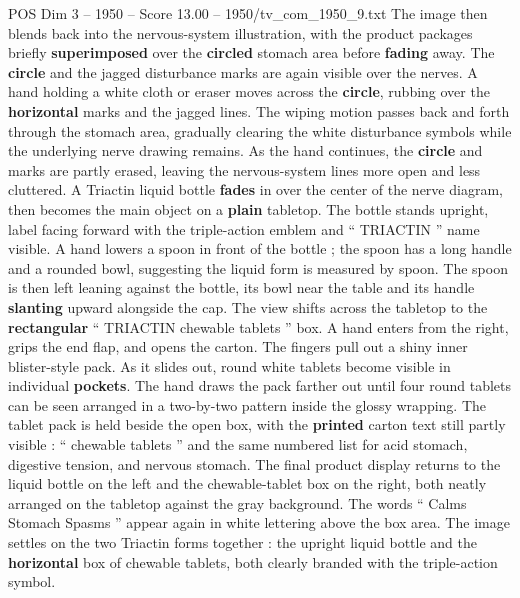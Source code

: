 \begin{textsample}{POS Dim 3 – 1950 – Score 13.00 – 1950/tv\_com\_1950\_9.txt}
The image then blends back into the nervous-system illustration, with the product packages briefly \textbf{superimposed} over the \textbf{circled} stomach area before \textbf{fading} away.
The \textbf{circle} and the jagged disturbance marks are again visible over the nerves.
A hand holding a white cloth or eraser moves across the \textbf{circle}, rubbing over the \textbf{horizontal} marks and the jagged lines.
The wiping motion passes back and forth through the stomach area, gradually clearing the white disturbance symbols while the underlying nerve drawing remains.
As the hand continues, the \textbf{circle} and marks are partly erased, leaving the nervous-system lines more open and less cluttered.
A Triactin liquid bottle \textbf{fades} in over the center of the nerve diagram, then becomes the main object on a \textbf{plain} tabletop.
The bottle stands upright, label facing forward with the triple-action emblem and “ TRIACTIN ” name visible.
A hand lowers a spoon in front of the bottle ; the spoon has a long handle and a rounded bowl, suggesting the liquid form is measured by spoon.
The spoon is then left leaning against the bottle, its bowl near the table and its handle \textbf{slanting} upward alongside the cap.
The view shifts across the tabletop to the \textbf{rectangular} “ TRIACTIN chewable tablets ” box.
A hand enters from the right, grips the end flap, and opens the carton.
The fingers pull out a shiny inner blister-style pack.
As it slides out, round white tablets become visible in individual \textbf{pockets}.
The hand draws the pack farther out until four round tablets can be seen arranged in a two-by-two pattern inside the glossy wrapping.
The tablet pack is held beside the open box, with the \textbf{printed} carton text still partly visible : “ chewable tablets ” and the same numbered list for acid stomach, digestive tension, and nervous stomach.
The final product display returns to the liquid bottle on the left and the chewable-tablet box on the right, both neatly arranged on the tabletop against the gray background.
The words “ Calms Stomach Spasms ” appear again in white lettering above the box area.
The image settles on the two Triactin forms together : the upright liquid bottle and the \textbf{horizontal} box of chewable tablets, both clearly branded with the triple-action symbol.

\end{textsample}
